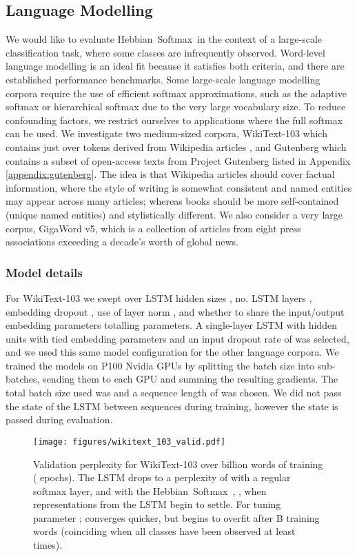 \documentclass{article} \usepackage{hyperref}
\newcommand{\model}{\hbox{Hebbian Softmax }}
\begin{document}
\subsection{Language Modelling}
We would like to evaluate \model in the context of a large-scale classification task, where some classes are infrequently observed. Word-level language modelling is an ideal fit because it satisfies both criteria, and there are established performance benchmarks. Some large-scale language modelling corpora require the use of efficient softmax approximations, such as the adaptive softmax \citep{grave2016efficient} or hierarchical softmax \citep{goodman2001classes} due to the very large vocabulary size. To reduce confounding factors, we restrict ourselves to applications where the full softmax can be used. We investigate two medium-sized corpora, WikiText-103  which contains just over  tokens derived from Wikipedia articles \citep{merity2016pointer}, and Gutenberg which contains a subset of open-access texts from Project Gutenberg listed in Appendix \ref{appendix:gutenberg}. The idea is that Wikipedia articles should cover factual information, where the style of writing is somewhat consistent and named entities may appear across many articles; whereas books should be more self-contained (unique named entities) and stylistically different. We also consider a very large corpus, GigaWord v5, which is a collection of articles from eight press associations exceeding a decade's worth of global news.

\subsubsection{Model details}
For WikiText-103 we swept over LSTM hidden sizes , no. LSTM layers , embedding dropout , use of layer norm \citep{ba2016layer} , and whether to share the input/output embedding parameters  totalling  parameters. A single-layer LSTM with  hidden units with tied embedding parameters and an input dropout rate of  was selected, and we used this same model configuration for the other language corpora. We trained the models on  P100 Nvidia GPUs by splitting the batch size into  sub-batches, sending them to each GPU and summing the resulting gradients. The total batch size used was  and a sequence length of  was chosen. We did not pass the state of the LSTM between sequences during training, however the state is passed during evaluation. 

\begin{figure}[]
    \centering
    \texttt{[image: figures/wikitext\_103\_valid.pdf]}
    \caption{Validation perplexity for WikiText-103 over  billion words of training ( epochs).
    The LSTM drops to a perplexity of  with a regular softmax layer, and  with the \model, , when representations from the LSTM begin to settle. For tuning parameter ;  converges quicker, but begins to overfit after B training words (coinciding when all classes have been observed at least  times).}
    \label{fig:wiki_valid}
\end{figure}
\end{document}
